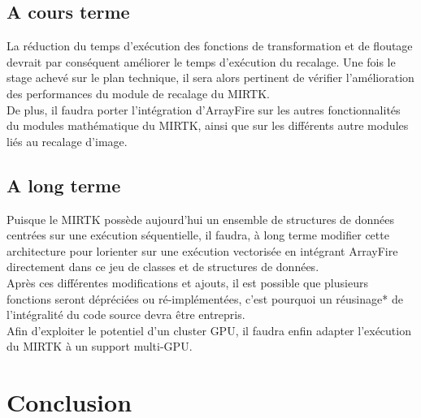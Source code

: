 \documentclass[10pt]{report}
\begin{document}
	\section{A cours terme}
	 La réduction du temps d'exécution des fonctions de transformation et de floutage devrait par conséquent améliorer le temps d'exécution du recalage. Une fois le stage achevé sur le plan technique, il sera alors pertinent de vérifier l'amélioration des performances du module de recalage du MIRTK.\\
	 De plus, il faudra porter l'intégration d'ArrayFire sur les autres fonctionnalités du modules mathématique du MIRTK, ainsi que sur les différents autre modules liés au recalage d'image.

	\section{A long terme}
	Puisque le MIRTK possède aujourd'hui un ensemble de structures de données centrées sur une exécution séquentielle, il faudra, à long terme modifier cette architecture pour lorienter sur une exécution vectorisée en intégrant ArrayFire directement dans ce jeu de classes et de structures de données.\\
	Après ces différentes modifications et ajouts, il est possible que plusieurs fonctions seront dépréciées ou ré-implémentées, c'est pourquoi un réusinage* de l'intégralité du code source devra être entrepris.\\  
	Afin d'exploiter le potentiel d'un cluster GPU, il faudra enfin adapter l'exécution du MIRTK à un support multi-GPU.  

\chapter*{Conclusion} 
\end{document}
